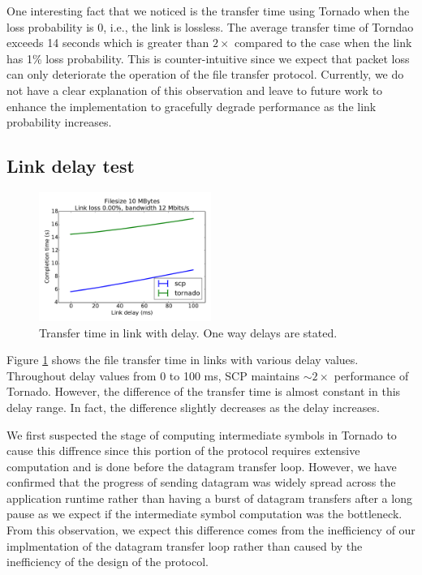 \documentclass{sig-alternate-10pt}
\begin{document}
One interesting fact that we noticed is the transfer time using Tornado when
the loss probability is 0, i.e., the link is lossless. The average transfer time of
Torndao exceeds 14 seconds which is greater than $2\times$ compared to the case
when the link has 1\% loss probability. This is counter-intuitive since we
expect that packet loss can only deteriorate the operation of the file transfer
protocol. Currently, we do not have a clear explanation of this observation and
leave to future work to enhance the implementation to gracefully degrade
performance as the link probability increases.


\subsection{Link delay test}

\begin{figure}[t]
  \centering
  \includegraphics[width=0.5\textwidth]{delay-plot}
  \caption{Transfer time in link with delay. One way delays are stated.}
  \label{f:delay-plot}
\end{figure}

Figure \ref{f:delay-plot} shows the file transfer time in links with various
delay values. Throughout delay values from 0 to 100 ms, SCP maintains $\sim
2\times$ performance of Tornado. However, the difference of the transfer time is
almost constant in this delay range. In fact, the difference slightly decreases
as the delay increases. 

We first suspected the stage of computing intermediate symbols in Tornado to
cause this diffrence since this portion of the protocol requires extensive
computation and is done before the datagram transfer loop.  However, we have
confirmed that the progress of sending datagram was widely spread across the
application runtime rather than having a burst of datagram transfers after a
long pause as we expect if the intermediate symbol computation was the
bottleneck. From this observation, we expect this difference comes from the
inefficiency of our implmentation of the datagram transfer loop rather than
caused by the inefficiency of the design of the protocol.
\end{document}
